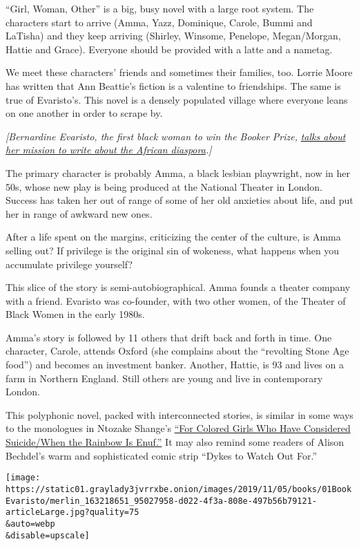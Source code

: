 ``Girl, Woman, Other'' is a big, busy novel with a large root system.
The characters start to arrive (Amma, Yazz, Dominique, Carole, Bummi and
LaTisha) and they keep arriving (Shirley, Winsome, Penelope,
Megan/Morgan, Hattie and Grace). Everyone should be provided with a
latte and a nametag.

We meet these characters' friends and sometimes their families, too.
Lorrie Moore has written that Ann Beattie's fiction is a valentine to
friendships. The same is true of Evaristo's. This novel is a densely
populated village where everyone leans on one another in order to scrape
by.

\emph{{[}Bernardine Evaristo, the first black woman to win the Booker
Prize,}
\href{https://www.nytimes3xbfgragh.onion/2019/11/01/books/bernardine-evaristo-girl-woman-other-booker-prize.html}{\emph{talks
about her mission to write about the African diaspora}}\emph{.{]}}

The primary character is probably Amma, a black lesbian playwright, now
in her 50s, whose new play is being produced at the National Theater in
London. Success has taken her out of range of some of her old anxieties
about life, and put her in range of awkward new ones.

After a life spent on the margins, criticizing the center of the
culture, is Amma selling out? If privilege is the original sin of
wokeness, what happens when you accumulate privilege yourself?

This slice of the story is semi-autobiographical. Amma founds a theater
company with a friend. Evaristo was co-founder, with two other women, of
the Theater of Black Women in the early 1980s.

Amma's story is followed by 11 others that drift back and forth in time.
One character, Carole, attends Oxford (she complains about the
``revolting Stone Age food'') and becomes an investment banker. Another,
Hattie, is 93 and lives on a farm in Northern England. Still others are
young and live in contemporary London.

This polyphonic novel, packed with interconnected stories, is similar in
some ways to the monologues in Ntozake Shange's
\href{https://www.nytimes3xbfgragh.onion/2019/10/22/theater/for-colored-girls-review-ntozake-shange.html}{``For
Colored Girls Who Have Considered Suicide/When the Rainbow Is Enuf.''}
It may also remind some readers of Alison Bechdel's warm and
sophisticated comic strip ``Dykes to Watch Out For.''

\texttt{[image: https://static01.graylady3jvrrxbe.onion/images/2019/11/05/books/01BookEvaristo/merlin\_163218651\_95027958-d022-4f3a-808e-497b56b79121-articleLarge.jpg?quality=75\\\&auto=webp\\\&disable=upscale]}

